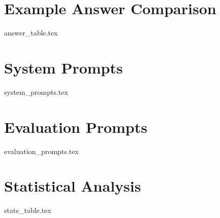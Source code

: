 \raggedbottom

\pagebreak
\section{Example Answer Comparison}
\label{app:question}
{answer_table.tex}

\raggedbottom

\pagebreak
\section{System Prompts}
\label{app:sys_prompts}
{system_prompts.tex}

\raggedbottom

\pagebreak
\section{Evaluation Prompts}
\label{app:eval_prompts}
{evaluation_prompts.tex}

\raggedbottom

\pagebreak
\section{Statistical Analysis}
\label{app:stats} 
{stats_table.tex}

\raggedbottom